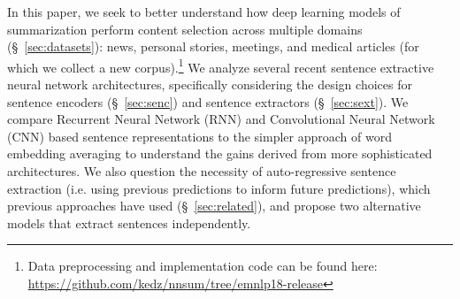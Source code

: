 In this paper, we seek to better understand how deep learning models of 
summarization perform content selection across multiple domains (\S~\ref{sec:datasets}): news, personal stories,
meetings, and medical articles (for which we collect a new corpus).\footnote{Data preprocessing and implementation code can be found here: \url{https://github.com/kedz/nnsum/tree/emnlp18-release}}
We analyze
several recent sentence extractive neural network architectures, 
specifically considering the design choices for sentence encoders (\S~\ref{sec:senc})
and sentence extractors (\S~\ref{sec:sext}). We compare Recurrent Neural Network (RNN) and Convolutional Neural
Network (CNN) based sentence representations to the 
simpler approach of word embedding averaging to understand the gains 
derived from more sophisticated architectures.
We also question the necessity of auto-regressive sentence extraction 
(i.e. using previous predictions to inform future predictions), 
which previous approaches have used (\S~\ref{sec:related}),
and propose two alternative models that extract sentences independently.
%
%
%
%
\\[-0.5em]

